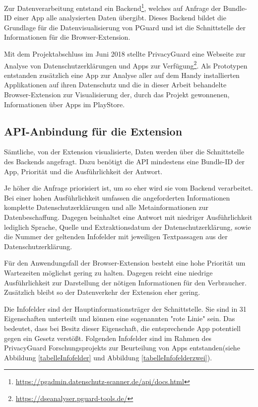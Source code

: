 Zur Datenverarbeitung entstand ein Backend\footnote{\url{https://pgadmin.datenschutz-scanner.de/api/docs.html}}, welches auf Anfrage der Bundle-ID einer App alle analysierten Daten übergibt. Dieses Backend bildet die Grundlage für die Datenvisualisierung von PGuard und ist die Schnittstelle der Informationen für die Browser-Extension.

Mit dem Projektabschluss im Juni 2018 stellte PrivacyGuard eine Webseite zur Analyse von Datenschutzerklärungen und Apps zur Verfügung\footnote{\url{https://dseanalyser.pguard-tools.de/}}. Als Prototypen entstanden zusätzlich eine App zur Analyse aller auf dem Handy installierten Applikationen auf ihren Datenschutz und die in dieser Arbeit behandelte Browser-Extension zur Visualisierung der, durch das Projekt gewonnenen, Informationen über Apps im PlayStore.

\subsection{API-Anbindung für die Extension}
\label{ss:apianbindung}

Sämtliche, von der Extension visualisierte, Daten werden über die Schnittstelle des Backends angefragt. Dazu benötigt die API mindestens eine Bundle-ID der App, Priorität und die Ausführlichkeit der Antwort.

Je höher die Anfrage priorisiert ist, um so eher wird sie vom Backend verarbeitet. 
Bei einer hohen Ausführlichkeit umfassen die angeforderten Informationen komplette Datenschutzerklärungen und alle Metainformationen zur Datenbeschaffung. Dagegen beinhaltet eine Antwort mit niedriger Ausführlichkeit lediglich Sprache, Quelle und Extraktionsdatum der Datenschutzerklärung, sowie die Nummer der geltenden Infofelder mit jeweiligen Textpassagen aus der Datenschutzerklärung.

Für den Anwendungsfall der Browser-Extension besteht eine hohe Priorität um Wartezeiten möglichst gering zu halten. Dagegen reicht eine niedrige Ausführlichkeit zur Darstellung der nötigen Informationen für den Verbraucher. Zusätzlich bleibt so der Datenverkehr der Extension eher gering.

Die Infofelder sind der Hauptinformationsträger der Schnittstelle. Sie sind in 31 Eigenschaften unterteilt und können eine sogenannten "rote Linie" sein. Das bedeutet, dass bei Besitz dieser Eigenschaft, die entsprechende App potentiell gegen ein Gesetz verstößt. Folgenden Infofelder sind im Rahmen des PrivacyGuard Forschungsprojekts zur Beurteilung von Apps entstanden(siehe Abbildung \ref{tabelleInfofelder} und Abbildung \ref{tabelleInfofelderzwei}).

